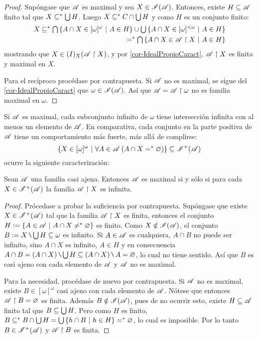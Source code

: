 	\begin{proof}
		Supóngase que $\mathscr{A}$ es maximal y sea $X \in \mathscr{I}(\mathscr{A})$. Entonces, existe $H \subseteq \mathscr{A}$ finito tal que $X \subseteq^* \mbox{$\bigcup$}\, H$. Luego $X \subseteq^* C \cap \mbox{$\bigcup$}\, H$ y como $H$ es un conjunto finito:
		\begin{align*}
			X \subseteq^* \mbox{$\bigcap$}\,\{ A \cap X \in [\omega]^\omega \text{ $|$ } A \in H \} \cup \mbox{$\bigcup$}\,\{ A \cap X \in [\omega]^{<\omega} \text{ $|$ } A \in H \} \\
			=^* \mbox{$\bigcap$}\,\{ A \cap X \in \mathscr{A} \upharpoonright X \text{ $|$ } A \in H \}
		\end{align*}
		mostrando que $X \in \mathscr{(}I)_X(\mathscr{A}\upharpoonright X)$, y por \ref{cor-IdealPropioCaract}, $\mathscr{A} \upharpoonright X$ es finita y maximal en $X$.

		Para el recíproco procédase por contrapuesta. Si $\mathscr{A}$ no es maximal, se sigue del \autoref{cor-IdealPropioCaract} que $\omega \in \mathscr{I}(\mathscr{A})$. Así que $\mathscr{A} = \mathscr{A} \upharpoonright \omega$ no es familia maximal en $\omega$. 
	\end{proof}

	Si $\mathscr{A}$ es maximal, cada subconjunto infinito de $\omega$ tiene intersección infinita con al menos un elemento de $\mathscr{A}$. En comparativa, cada conjunto en la parte positiva de $\mathscr{A}$ tiene un comportamiento más fuerte, más allá de complirse:
	\[ \{X \in [\omega]^{\omega} \text{ $|$ } \forall A \in \mathscr{A} \: (A \cap X =^* \varnothing) \} \subseteq \mathscr{I}^+(\mathscr{A}) \]
	ocurre la siguiente caracterización:

	\begin{proposicion}\label{prop-CaracMADPositiv}
		Sean $\mathscr{A}$ una familia casi ajena. Entonces $\mathscr{A}$ es maximal si y sólo si para cada $X \in \mathscr{I}^+(\mathscr{A})$ la familia $\mathscr{A} \upharpoonright X$ es infinita.
	\end{proposicion}
	
	\begin{proof}
		Prócedase a probar la suficiencia por contrapuesta. Supóngase que existe $X \in \mathscr{I}^+(\mathscr{A})$ tal que la familia $\mathscr{A} \upharpoonright X$ es finita, entonces el conjunto $H:=\{ A \in \mathscr{A} \text{ $|$ } A \cap X \neq^* \varnothing \}$ es finito. Como $X \notin \mathscr{I}(\mathscr{A})$, el conjunto $B:=X \setminus \midcup H \subseteq \omega$ es infinito. Si $A \in \mathscr{A}$ es cualquiera, $A \cap B$ no puede ser infinito, sino $A \cap X$ es infinito, $A \in H$ y en consecuencia $A \cap B = (A \cap X) \setminus \midcup H \subseteq (A \cap X) \setminus A = \emptyset$, lo cual no tiene sentido. Así que $B$ es casi ajeno con cada elemento de $\mathscr{A}$ y $\mathscr{A}$ no es maximal.
	
		Para la necesidad, procédase de nuevo por contrapuesta. Si $\mathscr{A}$ no es maximal, existe $B \in [\omega]^\omega$ casi ajeno con cada elemento de $\mathscr{A}$. Nótese que entonces $\mathscr{A} \upharpoonright B = \varnothing$ es finita. Además $B \notin \mathscr{I}(\mathscr{A})$, pues de no ocurrir esto, existe $H \subseteq \mathscr{A}$ finito tal que $B \subseteq \mbox{$\bigcup$}\, H$. Pero como $H$ es finito, $B \subseteq^* B \cap \mbox{$\bigcup$}\, H = \mbox{$\bigcup$}\, \{ h \cap B \text{ $|$ } h \in H \} =^* \varnothing$, lo cual es imposible. Por lo tanto $B \in \mathscr{I}^+(\mathscr{A})$ y $\mathscr{A} \upharpoonright B$ es finita. 
	\end{proof}
	
